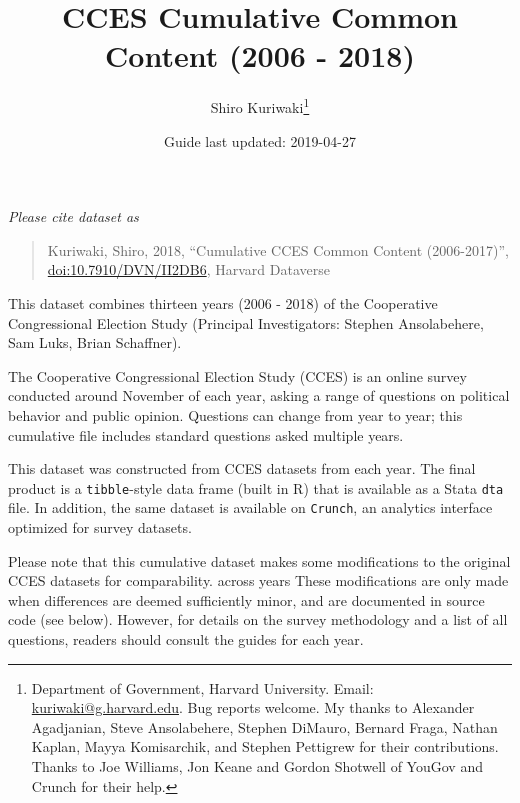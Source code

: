 \documentclass[10pt,article,oneside]{memoir}
\title{ \LARGE\textbf{CCES Cumulative Common Content (2006 - 2018)}}
\author{Shiro Kuriwaki\thanks{Department of Government, Harvard University. Email:
\url{kuriwaki@g.harvard.edu}. Bug reports welcome. My thanks to
Alexander Agadjanian, Steve Ansolabehere, Stephen DiMauro, Bernard
Fraga, Nathan Kaplan, Mayya Komisarchik, and Stephen Pettigrew for their
contributions. Thanks to Joe Williams, Jon Keane and Gordon Shotwell of
YouGov and Crunch for their help.}  }
\date{Guide last updated: 2019-04-27}
\theoremstyle{definition}
\begin{document}
\maketitle





\renewcommand\UrlFont{\color{crimson}\ttfamily}

\emph{Please cite dataset as}

\begin{quote}
Kuriwaki, Shiro, 2018, ``Cumulative CCES Common Content (2006-2017)'',
\href{https://dataverse.harvard.edu/dataset.xhtml?persistentId=doi:10.7910/DVN/II2DB6}{\url{doi:10.7910/DVN/II2DB6}},
Harvard Dataverse
\end{quote}

\noindent This dataset combines thirteen years (2006 - 2018) of the
Cooperative Congressional Election Study (Principal Investigators:
Stephen Ansolabehere, Sam Luks, Brian Schaffner).

The Cooperative Congressional Election Study (CCES) is an online survey
conducted around November of each year, asking a range of questions on
political behavior and public opinion. Questions can change from year to
year; this cumulative file includes standard questions asked multiple
years.

This dataset was constructed from CCES datasets from each year. The
final product is a \texttt{tibble}-style data frame (built in R) that is
available as a Stata \texttt{dta} file. In addition, the same dataset is
available on \texttt{Crunch}, an analytics interface optimized for
survey datasets.

Please note that this cumulative dataset makes some modifications to the
original CCES datasets for comparability. across years These
modifications are only made when differences are deemed sufficiently
minor, and are documented in source code (see below). However, for
details on the survey methodology and a list of all questions, readers
should consult the guides for each year.

\bigskip
\end{document}

